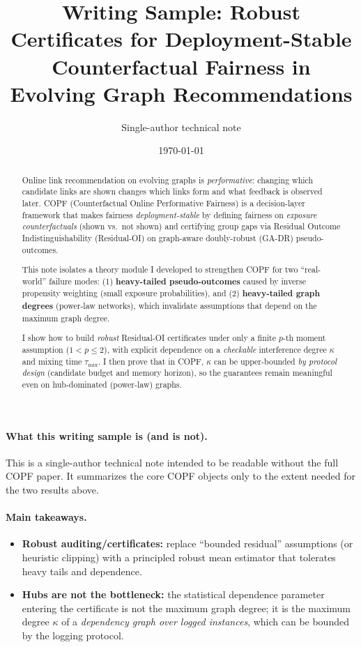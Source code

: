 \documentclass[11pt]{article}
\title{\vspace{-1.2em}Writing Sample: Robust Certificates for Deployment-Stable\\ Counterfactual Fairness in Evolving Graph Recommendations}
\author{\vspace{-0.6em}Single-author technical note}
\date{\vspace{-0.8em}\today}
\newcommand{\1}{\mathbf{1}}
\theoremstyle{plain}
\theoremstyle{definition}
\theoremstyle{remark}
\begin{document}
\maketitle

\begin{abstract}
Online link recommendation on evolving graphs is \emph{performative}: changing which candidate links are shown
changes which links form and what feedback is observed later.
COPF (Counterfactual Online Performative Fairness) is a decision-layer framework that makes fairness
\emph{deployment-stable} by defining fairness on \emph{exposure counterfactuals} (shown vs.~not shown)
and certifying group gaps via Residual Outcome Indistinguishability (Residual-OI) on
graph-aware doubly-robust (GA-DR) pseudo-outcomes.

This note isolates a theory module I developed to strengthen COPF for two ``real-world'' failure modes:
(1) \textbf{heavy-tailed pseudo-outcomes} caused by inverse propensity weighting (small exposure probabilities),
and (2) \textbf{heavy-tailed graph degrees} (power-law networks), which invalidate assumptions that depend on the
maximum graph degree.

I show how to build \emph{robust} Residual-OI certificates under only a finite $p$-th moment assumption ($1<p\le 2$),
with explicit dependence on a \emph{checkable} interference degree $\kappa$ and mixing time $\tau_{\mathrm{mix}}$.
I then prove that in COPF, $\kappa$ can be upper-bounded \emph{by protocol design} (candidate budget and memory horizon),
so the guarantees remain meaningful even on hub-dominated (power-law) graphs.
\end{abstract}

\paragraph{What this writing sample is (and is not).}
This is a single-author technical note intended to be readable without the full COPF paper.
It summarizes the core COPF objects only to the extent needed for the two results above.

\paragraph{Main takeaways.}
\begin{itemize}[leftmargin=1.4em]
  \item \textbf{Robust auditing/certificates:} replace ``bounded residual'' assumptions (or heuristic clipping) with
  a principled robust mean estimator that tolerates heavy tails and dependence.
  \item \textbf{Hubs are not the bottleneck:} the statistical dependence parameter entering the certificate is not
  the maximum graph degree; it is the maximum degree $\kappa$ of a \emph{dependency graph over logged instances},
  which can be bounded by the logging protocol.
\end{itemize}
\end{document}
